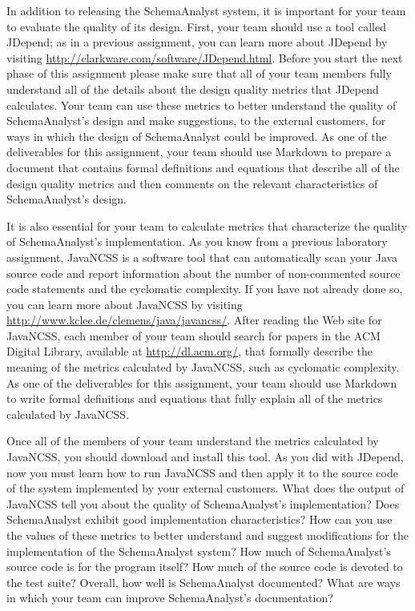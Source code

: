 In addition to releasing the SchemaAnalyst system, it is important for your team to evaluate the quality of its design.
First, your team should use a tool called JDepend; as in a previous assignment, you can learn more about JDepend by
visiting \url{http://clarkware.com/software/JDepend.html}.  Before you start the next phase of this assignment please
make sure that all of your team members fully understand all of the details about the design quality metrics that
JDepend calculates.  Your team can use these metrics to better understand the quality of SchemaAnalyst's design and
make suggestions, to the external customers, for ways in which the design of SchemaAnalyst could be improved. As one of
the deliverables for this assignment, your team should use Markdown to prepare a document that contains formal
definitions and equations that describe all of the design quality metrics and then comments on the relevant
characteristics of SchemaAnalyst's design.

It is also essential for your team to calculate metrics that characterize the quality of SchemaAnalyst's implementation.
As you know from a previous laboratory assignment, JavaNCSS is a software tool that can automatically scan your Java
source code and report information about the number of non-commented source code statements and the cyclomatic
complexity.  If you have not already done so, you can learn more about JavaNCSS by visiting
\url{http://www.kclee.de/clemens/java/javancss/}. After reading the Web site for JavaNCSS, each member of your team
should search for papers in the ACM Digital Library, available at \url{http://dl.acm.org/}, that formally describe the
meaning of the metrics calculated by JavaNCSS, such as cyclomatic complexity. As one of the deliverables for this
assignment, your team should use Markdown to write formal definitions and equations that fully explain all of the
metrics calculated by JavaNCSS.

Once all of the members of your team understand the metrics calculated by JavaNCSS, you should download and install this
tool.  As you did with JDepend, now you must learn how to run JavaNCSS and then apply it to the source code of the
system implemented by your external customers.  What does the output of JavaNCSS tell you about the quality of
SchemaAnalyst's implementation? Does SchemaAnalyst exhibit good implementation characteristics? How can you use the
values of these metrics to better understand and suggest modifications for the implementation of the SchemaAnalyst
system? How much of SchemaAnalyst's source code is for the program itself? How much of the source code is devoted to the
test suite?  Overall, how well is SchemaAnalyst documented? What are ways in which your team can improve SchemaAnalyst's
documentation?

